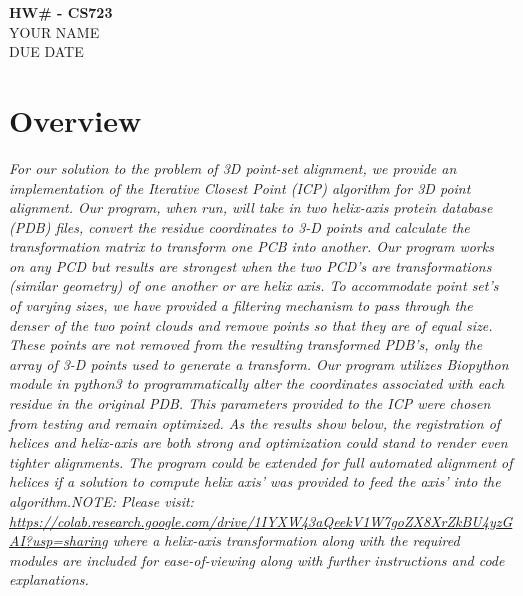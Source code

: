 \documentclass[12pt]{article}
\begin{document}
\begin{centering}
{\large\textbf{HW\# - CS723}}\\ %
YOUR NAME\\                     %
DUE DATE\\                      %
\end{centering}


\section*{Overview}

\emph{For our solution to the problem of 3D point-set alignment, we provide an implementation of the Iterative Closest Point (ICP) algorithm for 3D point alignment.  Our program, when run, will take in two helix-axis protein database (PDB) files, convert the residue coordinates to 3-D points and calculate the transformation matrix to transform one PCB into another.  Our program works on any PCD but results are strongest when the two PCD's are transformations (similar geometry) of one another or are helix axis.  To accommodate point set's of varying sizes, we have provided a filtering mechanism to pass through the denser of the two point clouds and remove points so that they are of equal size.  These points are not removed from the resulting transformed PDB's, only the array of 3-D points used to generate a transform.  Our program utilizes Biopython module in python3 to programmatically alter the coordinates associated with each residue in the original PDB. This parameters provided to the ICP were chosen from testing and remain optimized. As the results show below, the registration of helices and helix-axis are both strong and optimization could stand to render even tighter alignments.  The program could be extended for full automated alignment of helices if a solution to compute helix axis' was provided to feed the axis' into the algorithm.\newline\newline NOTE: 
Please visit: \url{https://colab.research.google.com/drive/1IYXW43aQeekV1W7goZX8XrZkBU4yzGAI?usp=sharing} where a helix-axis transformation along with the required modules are included for ease-of-viewing along with further instructions and code explanations.}
\end{document}

